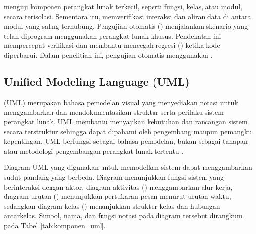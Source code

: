 menguji komponen perangkat lunak terkecil, seperti fungsi, kelas, atau modul, secara terisolasi. Sementara itu,  memverifikasi interaksi dan aliran data di antara modul yang saling terhubung. Pengujian otomatis () menjalankan skenario yang telah diprogram menggunakan perangkat lunak khusus. Pendekatan ini mempercepat verifikasi dan membantu mencegah regresi () ketika kode diperbarui. Dalam penelitian ini, pengujian otomatis menggunakan .

\subsection{Unified Modeling Language (UML)}
 (UML) merupakan bahasa pemodelan visual yang menyediakan notasi untuk menggambarkan dan mendokumentasikan struktur serta perilaku sistem perangkat lunak. UML membantu menyajikan kebutuhan dan rancangan sistem secara terstruktur sehingga dapat dipahami oleh pengembang maupun pemangku kepentingan. UML berfungsi sebagai bahasa pemodelan, bukan sebagai tahapan atau metodologi pengembangan perangkat lunak tertentu \citep{larman_applying_2005}.

Diagram UML yang digunakan untuk memodelkan sistem dapat menggambarkan sudut pandang yang berbeda. Diagram  menunjukkan fungsi sistem yang berinteraksi dengan aktor, diagram aktivitas () menggambarkan alur kerja, diagram urutan () menunjukkan pertukaran pesan menurut urutan waktu, sedangkan diagram kelas () menunjukkan struktur kelas dan hubungan antarkelas. Simbol, nama, dan fungsi notasi pada diagram tersebut dirangkum pada Tabel \ref{tab:komponen_uml}.

